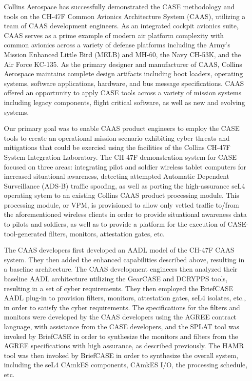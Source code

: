 Collins Aerospace has successfully demonstrated the CASE methodology and tools on the CH-47F Common
Avionics Architecture System (CAAS), utilizing a team of CAAS development engineers. As an
integrated cockpit avionics suite, CAAS serves as a prime example of modern air platform complexity
with common avionics across a variety of defense platforms including the Army's Mission Enhanced
Little Bird (MELB) and MH-60, the Navy CH-53K, and the Air Force KC-135. As the primary designer and
manufacturer of CAAS, Collins Aerospace maintains complete design artifacts including boot loaders,
operating systems, software applications, hardware, and bus message specifications. CAAS offered an
opportunity to apply CASE tools across a variety of mission systems including legacy components,
flight critical software, as well as new and evolving systems.

Our primary goal was to enable CAAS product engineers to employ the CASE tools to create an
operational mission scenario exhibiting cyber threats and mitigations that could be exercied using
the facilities of the Collins CH-47F System Integration Laboratory. The CH-47F demonstration system
for CASE focused on three areas: integrating pilot and soldier wireless tablet computers for
increased situational awareness, detecting attempted Automatic Dependent Surveillance (ADS-B)
traffic spoofing, as well as porting the high-assurance seL4 operating sytem to an existing Collins
CAAS product processing module. This processing module, or VPM, is provisioned to allow only vetted
traffic to/from the aforementioned wireless clients in order to provide situational awareness data
to pilots and soldiers, as well as to provide a platform for the execution of CASE-tool-generated
filters, monitors, attestation gates, etc.

The CAAS developers first developed an AADL model of the CH-47F CAAS system. They then added the
enhanced capabilities described above, resulting in a baseline architecture. The CAAS development
engineers then analyzed their baseline AADL architecture utilizing the GearCASE and DCRYPPS tools,
resulting in a set of cyber requirements. They then employed the BriefCASE AADL plug-in to provision
filters, monitors, attestation gates, seL4 isolates, etc., in order to satisfy the cyber
requirements. The specifications for the filters and monitors were developed by the CAAS developers
using the AGREE contract language, with assistance from the CASE developers, and the SPLAT tool was
invoked by BriefCASE in order to synthesize the monitors and filters from the AGREE specifications
with high assurance, as described previously. The HAMR tool was then invoked by BriefCASE in order
to synthesize the overall system, including the seL4 CAmkES components, CAmkES I/O, the processing
schedule, etc.

